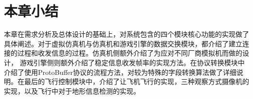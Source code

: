 \section{本章小结}
本章在需求分析及总体设计的基础上，对系统包含的四个模块核心功能的实现做了具体阐述。对于虚拟仿真机与仿真机和游戏引擎的数据交换模块，都介绍了建立连接的过程和收发信息的过程。仿真机侧额外介绍了为应对不同厂商模拟机而做的设计，
游戏引擎侧则额外介绍了稳定信息收发帧率的实现方法。在协议转换模块中介绍了使用ProtoBuffer协议的流程方法，对较为特殊的字段转换算法做了详细说明。在最后的飞行控制模块中，介绍了让飞机飞行的实现，三种观察方式摄像机的实现，以及飞行中对于地形信息检测的实现。